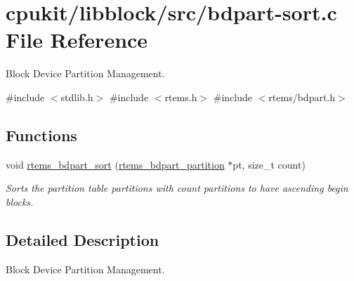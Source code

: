 \hypertarget{bdpart-sort_8c}{}\section{cpukit/libblock/src/bdpart-\/sort.c File Reference}
\label{bdpart-sort_8c}


Block Device Partition Management.  


{\ttfamily \#include $<$stdlib.\+h$>$}\newline
{\ttfamily \#include $<$rtems.\+h$>$}\newline
{\ttfamily \#include $<$rtems/bdpart.\+h$>$}\newline
\subsection*{Functions}
\begin{DoxyCompactItemize}
\item 
void \mbox{\hyperlink{group__rtems__bdpart_gaec68d844510e8516ae962f29d1cdd384}{rtems\+\_\+bdpart\+\_\+sort}} (\mbox{\hyperlink{structrtems__bdpart__partition}{rtems\+\_\+bdpart\+\_\+partition}} $\ast$pt, size\+\_\+t count)
\begin{DoxyCompactList}\small\item\em Sorts the partition table {\itshape partitions} with {\itshape count} partitions to have ascending begin blocks. \end{DoxyCompactList}\end{DoxyCompactItemize}


\subsection{Detailed Description}
Block Device Partition Management. 

